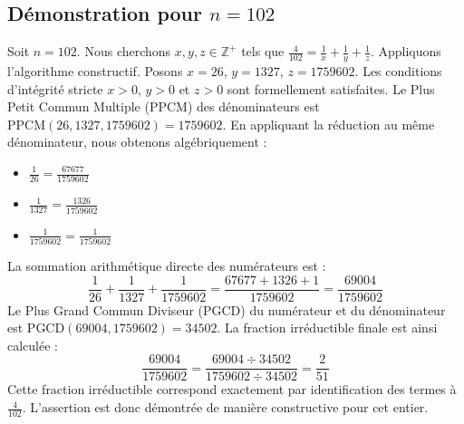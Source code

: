\documentclass[11pt,a4paper]{article}
\begin{document}
\subsection{Démonstration pour $n = 102$}
Soit $n = 102$. Nous cherchons $x, y, z \in \mathbb{Z}^{+}$ tels que $\frac{4}{102} = \frac{1}{x} + \frac{1}{y} + \frac{1}{z}$.
Appliquons l'algorithme constructif. Posons $x = 26$, $y = 1327$, $z = 1759602$.
Les conditions d'intégrité stricte $x > 0$, $y > 0$ et $z > 0$ sont formellement satisfaites.
Le Plus Petit Commun Multiple (PPCM) des dénominateurs est $\text{PPCM}(26, 1327, 1759602) = 1759602$.
En appliquant la réduction au même dénominateur, nous obtenons algébriquement :
\begin{itemize}
    \item $\frac{1}{26} = \frac{67677}{1759602}$
    \item $\frac{1}{1327} = \frac{1326}{1759602}$
    \item $\frac{1}{1759602} = \frac{1}{1759602}$
\end{itemize}
La sommation arithmétique directe des numérateurs est :
$$ \frac{1}{26} + \frac{1}{1327} + \frac{1}{1759602} = \frac{67677 + 1326 + 1}{1759602} = \frac{69004}{1759602} $$
Le Plus Grand Commun Diviseur (PGCD) du numérateur et du dénominateur est $\text{PGCD}(69004, 1759602) = 34502$.
La fraction irréductible finale est ainsi calculée :
$$ \frac{69004}{1759602} = \frac{69004 \div 34502}{1759602 \div 34502} = \frac{2}{51} $$
Cette fraction irréductible correspond exactement par identification des termes à $\frac{4}{102}$. L'assertion est donc démontrée de manière constructive pour cet entier.
\end{document}
